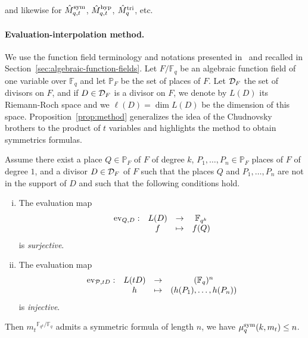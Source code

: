 \noindent and likewise for $\hat{M}^{\textrm{sym}}_{q,t}$, $\hat{M}^{\textrm{hyp}}_{q,t}$, $\hat{M}^{\textrm{tri}}_q$, etc.


\paragraph{Evaluation-interpolation method.}
We use the function field terminology and notations
presented in~\cite{Stichtenoth09} and recalled in
Section~\ref{sec:algebraic-function-fields}. Let $F/\mathbb{F}_q$ be an algebraic
function field of one variable over $\mathbb{F}_{q}$ and let $\mathbb{P}_F$ be the
set of places of $F$. Let $\mathcal{D}_F$ the set of
divisors on $F$, and if $D\in\mathcal{D}_F$ is a divisor on
$F$, we denote by $L(D)$ its Riemann-Roch space and we $\ell(D)=\dim L(D)$ be
the dimension of this space. Proposition~\ref{prop:method} generalizes the idea
of the Chudnovsky brothers to the product of $t$ variables and highlights the
method to obtain symmetrics formulas.
\begin{prop}
  \label{prop:method}
  Assume there exist a place $Q\in\mathbb{P}_{F}$ of $F$ of degree $k$, $P_1,
  \dots, P_n\in\mathbb{P}_F$ places of $F$ of degree $1$, and a divisor
  $D\in\mathcal{D}_F$ of $F$ such that the places $Q$ and $P_1, \dots, P_n$ are not in
  the support of $D$ and such that the following conditions hold.
  \begin{enumerate}[(i)]
    \item \label{cond:1} The evaluation map
      \[
        \begin{array}{cccc}
        \operatorname{ev}_{Q, D}: & L(D) & \to & \mathbb{F}_{q^k}\\
  & f & \mapsto & f(Q)
\end{array}
\]
is \emph{surjective}.
    \item \label{cond:2} The evaluation map
      \[
        \begin{array}{cccc}
        \operatorname{ev}_{\mathcal{P}, tD}: & L(tD) & \to & (\mathbb{F}_{q})^n\\
  & h & \mapsto & (h(P_1), \dots, h(P_n))
\end{array}
\]
is \emph{injective}.
  \end{enumerate}
  Then ${m_t}^{\mathbb{F}_{q^k}/\mathbb{F}_q}$ admits a symmetric formula of length $n$, \ie we have $\mu^{\textrm{sym}}_q(k,m_t)\leq n$.
\end{prop}
